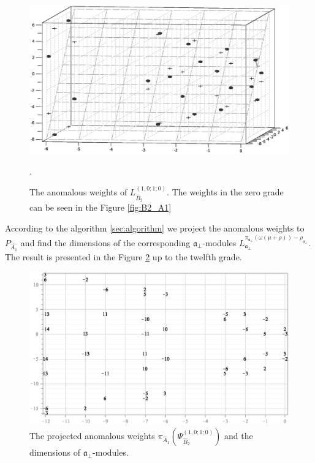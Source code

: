\documentclass[12pt]{iopart}
\theoremstyle{definition}
\theoremstyle{definition}
\theoremstyle{definition}
\theoremstyle{definition}
\begin{document}
\begin{figure}[h!tb]
  \includegraphics[width=140mm]{figure11.eps}
  \caption{The anomalous weights of $L^{(1,0;1;0)}_{\hat B_2 }$.
  The weights in the zero grade can be seen in the Figure \ref{fig:B2_A1}}.
  \label{fig:affine_B2_anom_point}
\end{figure}

According to the algorithm \ref{sec:algorithm} we project the anomalous weights to
$P_{\hat{A_1}}$ and find the dimensions of the corresponding
$\mathfrak{a}_{\bot}$-modules $L^{\pi_{\mathfrak{a}_{\bot}}(\omega(\mu+\rho))-\rho_{\mathfrak{a}_{\bot}}}_{\mathfrak{a}_{\bot}}$.
The result is presented in the Figure
\ref{fig:AffineB2_A1_anom_proj} up to the twelfth grade.
\begin{figure}[h!tb]
  \centering
  \includegraphics[width=120mm]{figure12.eps}
  \caption{The projected anomalous weights $\pi_{\hat A_1}\left(\Psi^{(1,0;1;0)}_{\hat B_2}\right)$ and the dimensions of $\mathfrak{a}_{\bot}$-modules.}
  \label{fig:AffineB2_A1_anom_proj}
\end{figure}
\end{document}
